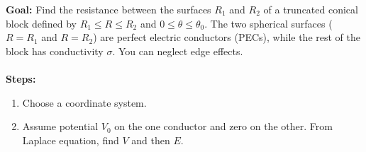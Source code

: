 \documentclass[../../header.tex]{subfiles}
\begin{document}
\textbf{Goal:} Find the resistance between the surfaces $R_1$ and $R_2$ of a truncated conical block defined by $R_1 \leq R \leq R_2$ and $0 \leq \theta \leq \theta_0$. The two spherical surfaces ($R=R_1$ and $R=R_2$) are perfect electric conductors (PECs), while the rest of the block has conductivity $\sigma$. You can neglect edge effects.\\
\\
\textbf{Steps:} 
\begin{enumerate}
\item Choose a coordinate system. \\

\item Assume potential $V_0$ on the one conductor and zero on the other. From  Laplace equation, find $V$ and then $E$. 


\end{enumerate}
\end{document}
